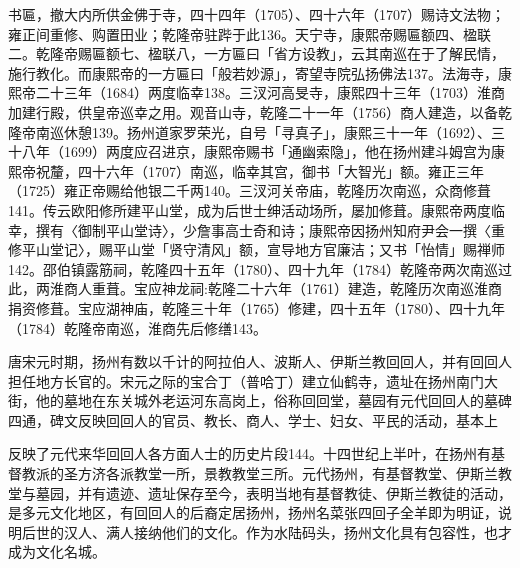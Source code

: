 \noindent 书匾，撤大内所供金佛于寺，四十四年（1705）、四十六年（1707）赐诗文法物；雍正间重修、购置田业；乾隆帝驻跸于此136。天宁寺，康熙帝赐匾额四、楹联二。乾隆帝赐匾额七、楹联八，一方匾曰「省方设教」，云其南巡在于了解民情，施行教化。而康熙帝的一方匾曰「般若妙源」，寄望寺院弘扬佛法137。法海寺，康熙帝二十三年（1684）两度临幸138。三汊河高旻寺，康熙四十三年（1703）淮商加建行殿，供皇帝巡幸之用。观音山寺，乾隆二十一年（1756）商人建造，以备乾隆帝南巡休憩139。扬州道家罗荣光，自号「寻真子」，康熙三十一年（1692）、三十八年（1699）两度应召进京，康熙帝赐书「通幽索隐」，他在扬州建斗姆宫为康熙帝祝釐，四十六年（1707）南巡，临幸其宫，御书「大智光」额。雍正三年（1725）雍正帝赐给他银二千两140。三汊河关帝庙，乾隆历次南巡，众商修葺141。传云欧阳修所建平山堂，成为后世士绅活动场所，屡加修葺。康熙帝两度临幸，撰有〈御制平山堂诗〉，少詹事高士奇和诗；康熙帝因扬州知府尹会一撰〈重修平山堂记〉，赐平山堂「贤守清风」额，宣导地方官廉洁；又书「怡情」赐禅师142。邵伯镇露筋祠，乾隆四十五年（1780）、四十九年（1784）乾隆帝两次南巡过此，两淮商人重葺。宝应神龙祠:乾隆二十六年（1761）建造，乾隆历次南巡淮商捐资修葺。宝应湖神庙，乾隆三十年（1765）修建，四十五年（1780）、四十九年（1784）乾隆帝南巡，淮商先后修缮143。

唐宋元时期，扬州有数以千计的阿拉伯人、波斯人、伊斯兰教回回人，并有回回人担任地方长官的。宋元之际的宝合丁（普哈丁）建立仙鹤寺，遗址在扬州南门大街，他的墓地在东关城外老运河东高岗上，俗称回回堂，墓园有元代回回人的墓碑四通，碑文反映回回人的官员、教长、商人、学士、妇女、平民的活动，基本上

\vfill
\begin{BookNotes}
\end{BookNotes}

\noindent 反映了元代来华回回人各方面人士的历史片段144。十四世纪上半叶，在扬州有基督教派的圣方济各派教堂一所，景教教堂三所。元代扬州，有基督教堂、伊斯兰教堂与墓园，并有遗迹、遗址保存至今，表明当地有基督教徒、伊斯兰教徒的活动，是多元文化地区，有回回人的后裔定居扬州，扬州名菜张四回子全羊即为明证，说明后世的汉人、满人接纳他们的文化。作为水陆码头，扬州文化具有包容性，也才成为文化名城。

